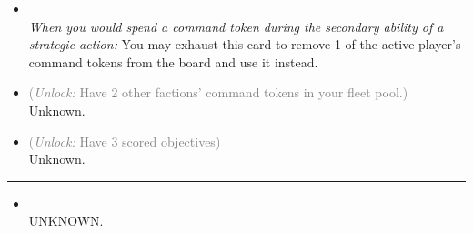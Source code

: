 \begin{multicols}{2}

\begin{itemize}
\item {}\\
\emph{When you would spend a command token during the secondary ability of a strategic action:}
You may exhaust this card to remove 1 of the active player's command tokens from the board and use it instead.
\item {} \textcolor{gray}{(\emph{Unlock:} Have 2 other factions' command tokens in your fleet pool.)}
Unknown. 
\item {} \textcolor{gray}{(\emph{Unlock:} Have 3 scored objectives)}\\
Unknown.
\end{itemize}

\vspace{-10pt}\rule{\hsize}{0.4pt}\vspace{5pt}


\begin{itemize}
\item {}\\
UNKNOWN.
\end{itemize}

\end{multicols}



